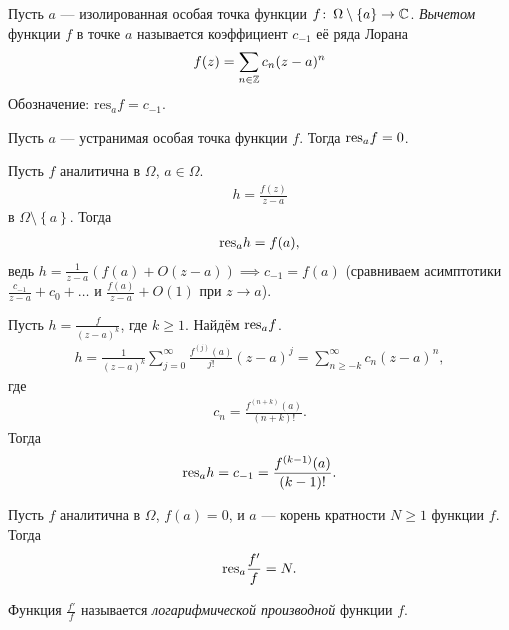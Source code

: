 \documentclass[../../main.tex]{subfiles}
\begin{document}
\begin{df}
 Пусть $ a $ --- изолированная особая точка функции $ f \colon\, \Omega \setminus \left\{ a \right\} \to \mathbb{C}$. \textit{Вычетом} функции $ f $ в точке $ a $ называется коэффициент $ c_{-1} $ её ряда Лорана
 \begin{align*}
  f(z) = \sum_{n \in \mathbb{Z}} c_n (z-a)^{n}
 \end{align*} Обозначение: $ \mathrm{res}_a f = c_{-1} $.
\end{df}
\begin{exmpl*}
 Пусть $ a $ --- устранимая особая точка функции $ f $. Тогда $ \mathrm{res}_a f = 0 $.
\end{exmpl*}
\begin{exmpl*}
 Пусть $ f $ аналитична в $ \Omega $, $ a \in \Omega $.
 \begin{align*}
  h = \frac{f(z)}{z - a}
 \end{align*} в $ \Omega \setminus \left\{ a \right\} $. Тогда 
 \begin{align*}
  \mathrm{res}_a h = f(a),
 \end{align*} ведь $ h = \frac{1}{z-a}(f(a)+O(z-a)) \implies c_{-1} = f(a) $ (сравниваем асимптотики $ \frac{c_{-1}}{z-a} + c_0 + \ldots $ и $ \frac{f(a)}{z-a} + O(1) $ при $ z\to a $).
\end{exmpl*}
\begin{exmpl*}
 Пусть $ h = \frac{f}{(z-a)^{k}} $, где $ k \geqslant 1 $. Найдём $ \mathrm{res}_a f $.
 \begin{align*}
 h = \frac{1}{(z-a)^{k}}\sum_{j=0}^{\infty} \frac{f^{(j)}(a)}{j!}(z-a)^{j} = \sum_{n \geqslant -k}^{\infty} c_n(z-a)^{n},
 \end{align*} где
 \begin{align*}
  c_n = \frac{f^{(n+k)}(a)}{(n+k)!}.
 \end{align*} Тогда
 \begin{align*}
  \mathrm{res}_a h = c_{-1} = \frac{f^{(k-1)}(a)}{(k-1)!}.
 \end{align*}
\end{exmpl*}
\begin{exmpl}
 \label{example:logarithmic_derivative1}
 Пусть $ f $ аналитична в $ \Omega $, $ f(a) = 0 $, и $ a $ --- корень кратности $ N \geqslant 1$ функции $ f $. Тогда
 \begin{align*}
  \mathrm{res}_a \frac{f'}{f} = N.
 \end{align*}

 Функция $ \frac{f'}{f} $  называется \textit{логарифмической производной} функции $ f $.
\end{exmpl}
\end{document}
